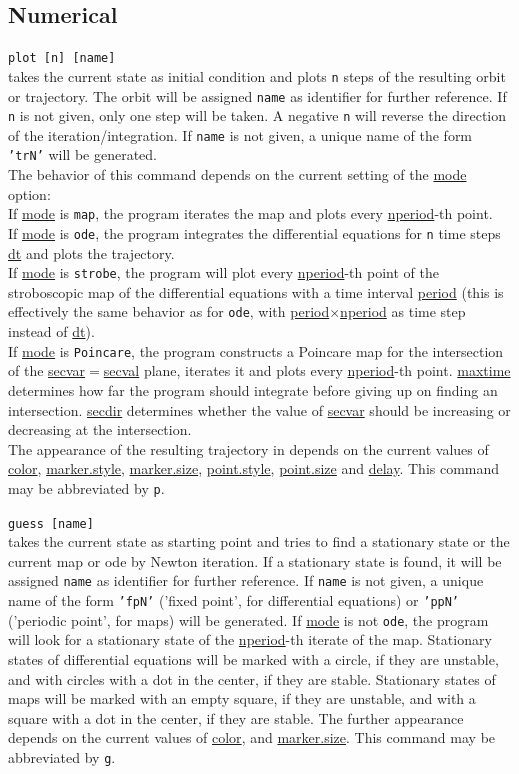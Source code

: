 \documentclass[10pt,a4paper,titlepage]{article}
\newcommand{\cmd}[2]{\item{\T{\hypertarget{#1}{#1}\index[index]{#1} #2}}}
\newcommand{\HL}[1]{\hyperlink{#1}{#1}}
\newcommand{\T}[1]{\texttt{#1}}
\begin{document}
\subsection{Numerical}
\begin{description}

\cmd{plot}{[n] [name]}\\takes the current state as initial condition and plots \T{n} steps of the resulting orbit or trajectory. The orbit will be assigned \T{name} as identifier for further reference. If \T{n} is not given, only one step will be taken. A negative \T{n} will reverse the direction of the iteration/integration. If \T{name} is not given, a unique name of the form \T{'trN'} will be generated.\\
The behavior of this command depends on the current setting of the \HL{mode} option:\\
If \HL{mode} is \T{map}, the program iterates the map and plots every \HL{nperiod}-th point.\\
If \HL{mode} is \T{ode}, the program integrates the differential equations for \T{n} time steps \HL{dt} and plots the trajectory.\\
If \HL{mode} is \T{strobe}, 
the program will plot every \HL{nperiod}-th point of the stroboscopic map of the differential equations with a time interval \HL{period} (this is effectively the same behavior as for \T{ode}, with \HL{period}$\times$\HL{nperiod} as time step instead of \HL{dt}).\\
If \HL{mode} is \T{Poincare}, the program constructs a Poincare map for the intersection of the \HL{secvar}$=$\HL{secval} plane, iterates it and plots every \HL{nperiod}-th point. \HL{maxtime} determines how far the program should integrate before giving up on finding an intersection. \HL{secdir} determines whether the value of \HL{secvar} should be increasing or decreasing at the intersection.\\ 
The appearance of the resulting trajectory in depends on the current values of \HL{color}, \HL{marker.style}, \HL{marker.size}, \HL{point.style}, \HL{point.size} and \HL{delay}. This command may be abbreviated by \T{p}.
\cmd{guess}{[name]}\\takes the current state as starting point and tries to find a stationary state or the current map or ode by Newton iteration. If a stationary state is found, it will be assigned \T{name} as identifier for further reference. If \T{name} is not given, a unique name of the form 
\T{'fpN'} ('fixed point', for differential equations) or \T{'ppN'} ('periodic point', for maps) will be generated. If \HL{mode} is not \T{ode}, the program will look for a stationary state of the \HL{nperiod}-th iterate of the map. Stationary states of differential equations will be marked with a circle, if they are unstable, and with circles with a dot in the center, if they are stable. Stationary states of maps will be marked with an empty square, if they are unstable, and with a square with a dot in the center, if they are stable. The further appearance depends on the current values of \HL{color}, and \HL{marker.size}. This command may be abbreviated by \T{g}.

\end{description}
\end{document}
